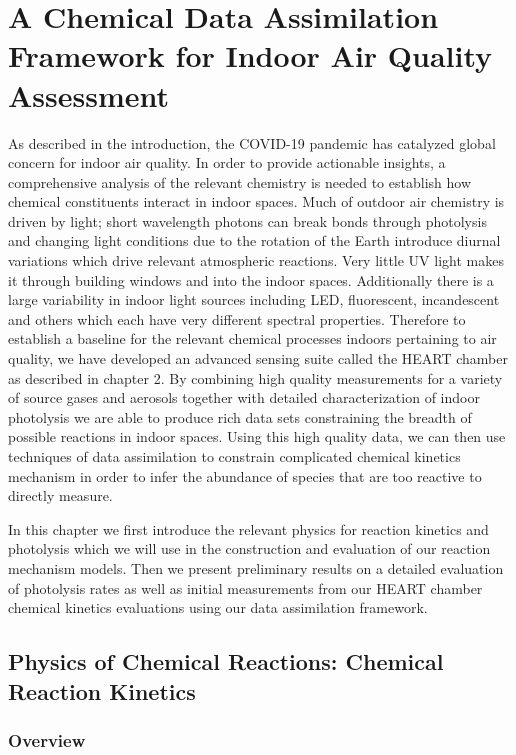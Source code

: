 \chapter{A Chemical Data Assimilation Framework for Indoor Air Quality Assessment}

As described in the introduction, the COVID-19 pandemic has catalyzed global concern for indoor air quality. In order to provide actionable insights, a comprehensive analysis of the relevant chemistry is needed to establish how chemical constituents interact in indoor spaces. Much of outdoor air chemistry is driven by light; short wavelength photons can break bonds through photolysis and changing light conditions due to the rotation of the Earth introduce diurnal variations which drive relevant atmospheric reactions. Very little UV light makes it through building windows and into the indoor spaces. Additionally there is a large variability in indoor light sources including LED, fluorescent, incandescent and others which each have very different spectral properties. Therefore to establish a baseline for the relevant chemical processes indoors pertaining to air quality, we have developed an advanced sensing suite called the HEART chamber as described in chapter 2. By combining high quality measurements for a variety of source gases and aerosols together with detailed characterization of indoor photolysis we are able to produce rich data sets constraining the breadth of possible reactions in indoor spaces. Using this high quality data, we can then use techniques of data assimilation to constrain complicated chemical kinetics mechanism in order to infer the abundance of species that are too reactive to directly measure.

In this chapter we first introduce the relevant physics for reaction kinetics and photolysis which we will use in the construction and evaluation of our reaction mechanism models. Then we present preliminary results on a detailed evaluation of photolysis rates as well as initial measurements from our HEART chamber chemical kinetics evaluations using our data assimilation framework.

\section{Physics of Chemical Reactions: Chemical Reaction Kinetics}

\subsection{Overview}

